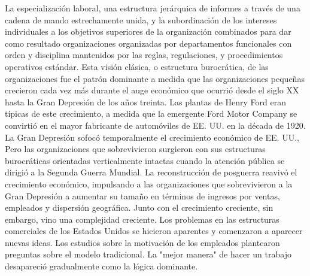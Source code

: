 \documentclass[10pt]{book}
\begin{document}
La especialización laboral, una estructura jerárquica de informes a través de una cadena de mando estrechamente unida, y la subordinación de los intereses individuales a los objetivos superiores de la organización combinados para dar como resultado organizaciones organizadas por departamentos funcionales con orden y disciplina mantenidos por las reglas, regulaciones, y procedimientos operativos estándar. Esta visión clásica, o estructura burocrática, de las organizaciones fue el patrón dominante a medida que las organizaciones pequeñas crecieron cada vez más durante el auge económico que ocurrió desde el siglo XX hasta la Gran Depresión de los años treinta. Las plantas de Henry Ford eran típicas de este crecimiento, a medida que la emergente Ford Motor Company se convirtió en el mayor fabricante de automóviles de EE. UU. en la década de 1920.\\
La Gran Depresión sofocó temporalmente el crecimiento económico de EE. UU., Pero las organizaciones que sobrevivieron surgieron con sus estructuras burocráticas orientadas verticalmente intactas cuando la atención pública se dirigió a la Segunda Guerra Mundial. La reconstrucción de posguerra reavivó el crecimiento económico, impulsando a las organizaciones que sobrevivieron a la Gran Depresión a aumentar su tamaño en términos de ingresos por ventas, empleados y dispersión geográfica. Junto con el crecimiento creciente, sin embargo, vino una complejidad creciente. Los problemas en las estructuras comerciales de los Estados Unidos se hicieron aparentes y comenzaron a aparecer nuevas ideas. Los estudios sobre la motivación de los empleados plantearon preguntas sobre el modelo tradicional. La "mejor manera" de hacer un trabajo desapareció gradualmente como la lógica dominante.
\end{document}

